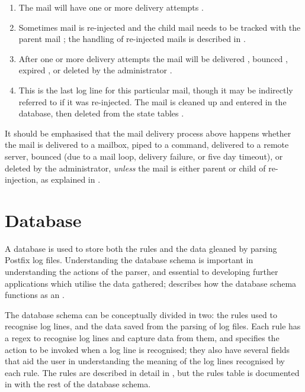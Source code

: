 \begin{enumerate}

    \item The mail will have one or more delivery attempts
        .

    \item Sometimes mail is re-injected and the child mail needs to be
        tracked with the parent mail ; the handling of
        re-injected mails is described in .

    \item After one or more delivery attempts the mail will be delivered
        , bounced ,
        expired , or deleted by the administrator
        .

    \item This is the last log line for this particular mail, though it may
        be indirectly referred to if it was re-injected.  The mail is
        cleaned up and entered in the database, then deleted from the state
        tables .

\end{enumerate}

It should be emphasised that the mail delivery process above happens
whether the mail is delivered to a mailbox, piped to a command, delivered
to a remote server, bounced (due to a mail loop, delivery failure, or five
day timeout), or deleted by the administrator, \textit{unless\/} the mail
is either parent or child of re-injection, as explained in
.

\section{Database}

\label{database}

A database is used to store both the rules and the data gleaned by parsing
Postfix log files.  Understanding the database schema is important in
understanding the actions of the parser, and essential to developing
further applications which utilise the data gathered;  describes how the database schema functions as an .

The database schema can be conceptually divided in two: the rules used to
recognise log lines, and the data saved from the parsing of log files.
Each rule has a regex to recognise log lines and capture data from them,
and specifies the action to be invoked when a log line is recognised; they
also have several fields that aid the user in understanding the meaning of
the log lines recognised by each rule.  The rules are described in detail
in , but the rules table is documented
in  with the rest of the database schema.

